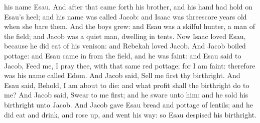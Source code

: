 his name Esau. And after that came forth his brother, and his hand had hold on Esau’s heel; and his name was called Jacob: and Isaac was threescore years old when she bare them.  And the boys grew: and Esau was a skilful hunter, a man of the field; and Jacob was a quiet man, dwelling in tents. Now Isaac loved Esau, because he did eat of his venison: and Rebekah loved Jacob. And Jacob boiled pottage: and Esau came in from the field, and he was faint: and Esau said to Jacob, Feed me, I pray thee, with that same red pottage; for I am faint: therefore was his name called Edom. And Jacob said, Sell me first thy birthright. And Esau said, Behold, I am about to die: and what profit shall the birthright do to me? And Jacob said, Swear to me first; and he sware unto him: and he sold his birthright unto Jacob. And Jacob gave Esau bread and pottage of lentils; and he did eat and drink, and rose up, and went his way: so Esau despised his birthright. 

